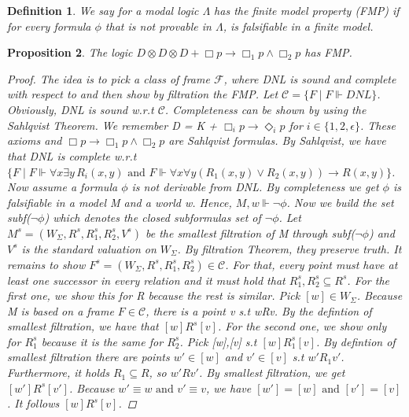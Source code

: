 \documentclass[12pt, a4paper]{scrartcl}
\newtheorem{definition}{Definition}[subsection]
\newtheorem{proposition}[definition]{Proposition}
\begin{document}
\begin{definition}
    We say for a modal logic $\Lambda$ has the finite model property (FMP) if for every formula $\phi$ that is not provable in $\Lambda$,
    is falsifiable in a finite model.
        
\end{definition}

\begin{proposition}
    The logic $D \otimes D \otimes D + \Box p \rightarrow \Box_1 p \land \Box_2 p$ has FMP.
    \begin{proof}
    The idea is to pick a class of frame $\mathcal{F}$, where DNL is sound and complete with respect to and then show by filtration the FMP. \newline \newline
    Let $\mathcal{C} = \{F \mid F \Vdash DNL\}$. Obviously,  DNL is sound w.r.t $\mathcal{C}$. Completeness can be shown by using the Sahlqvist Theorem.
    We remember D = K + $\Box_i p \rightarrow \Diamond_i p$ for $i \in \{1,2, \epsilon\}$. These axioms and $\Box p \rightarrow \Box_1 p \land \Box_2 p$ are Sahlqvist formulas. 
    By Sahlqvist, we have that DNL is complete w.r.t $\{F \mid F \Vdash \forall x \exists y \, R_i(x,y) \mbox{ and } F \Vdash \forall x \forall y (R_1(x,y) \lor R_2(x,y)) \rightarrow R(x,y)\}$. \newline \newline
    Now assume a formula $\phi$ is not derivable from DNL. By completeness we get $\phi$ is falsifiable in a model M and a world w. Hence, $M,w \Vdash \neg \phi$. Now we build the set subf($\neg \phi$) which denotes the closed subformulas set of $\neg \phi$.
    Let $M^s = (W_\Sigma, R^s, R^s_1, R^s_2, V^s)$ be the smallest filtration of M through subf($\neg \phi$) and $V^s$ is the standard valuation on $W_\Sigma$. By filtration Theorem, they preserve truth.
    It remains to show $F^s = (W_\Sigma, R^s, R^s_1, R^s_2)\in  \mathcal{C}$. For that, every point must have at least one successor in every relation and it must hold that $R^s_1,R^s_2 \subseteq R^s$. For the first one, we show this for R because the rest is similar.
    Pick $[w]\in W_\Sigma$. Because M is based on a frame $F \in \mathcal{C}$, there is a point v s.t wRv. By the defintion of smallest filtration, we have that $[w]R^s[v]$. For the second one, we show only for $R^s_1$ because it is the same for $R^s_2$.
    Pick [w],[v] s.t $[w]R^s_1[v]$. By defintion of smallest filtration there are points $w' \in [w]$ and $v' \in [v]$ s.t $w'R_1v'$. Furthermore, it holds $R_1 \subseteq R$, so $w'Rv'$.
    By smallest filtration, we get $[w']R^s[v']$. Because $w' \equiv w \mbox{ and } v' \equiv v$, we have $[w'] = [w] \mbox{ and } [v'] = [v]$. It follows $[w]R^s[v]$.
    
    \end{proof}
        
\end{proposition}
\end{document}
